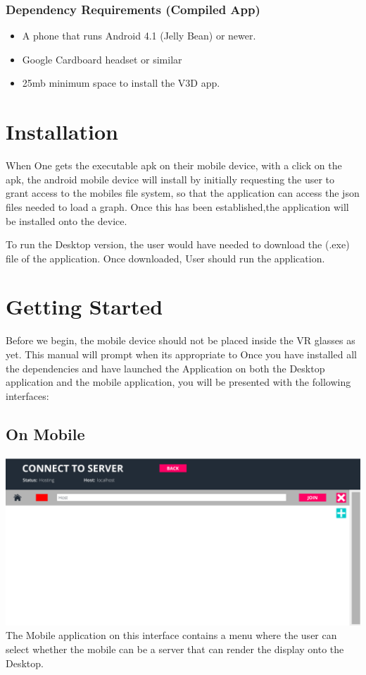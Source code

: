 \documentclass[english]{article}
\begin{document}
\subsubsection{Dependency Requirements (Compiled App)}

\begin{itemize}
   \item A phone that runs Android 4.1 (Jelly Bean) or newer.
    
   \item Google Cardboard headset or similar
    
   \item 25mb minimum space to install the V3D app. 
\end{itemize} 


\section{Installation}
When One gets the executable apk on their mobile device, with a click on the apk, the android mobile device will install by initially requesting the user to grant access to the mobiles file system, so that the application can access the json files needed to load a graph. Once this has been established,the application will be installed onto the device. 

To run the Desktop version, the user would have needed to download the (.exe) file of the application. Once downloaded, User should run the application. 
\section{Getting Started}
Before we begin, the mobile device should not be placed inside the VR glasses as yet. This manual will prompt when its appropriate to 
Once you have installed all the dependencies and have launched the Application on both the Desktop application and the mobile application, you will be presented with the following interfaces:
\subsection{On Mobile}
\includegraphics[scale=0.4]{mobileScreen.png}
The Mobile application on this interface contains a menu where the user can select whether the mobile can be a server that can render the display onto the Desktop. 
\end{document}
